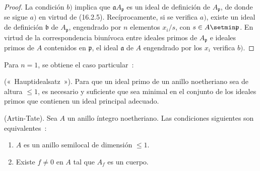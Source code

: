 \begin{proof}
La condición $b)$ implica que $\mathfrak{a}A_{\mathfrak{p}}$ es un ideal de
definición de $A_{\mathfrak{p}}$, de donde se sigue $a)$ en virtud de (16.2.5).
Recíprocamente, si se verifica $a)$, existe un ideal de definición
$\mathfrak{b}$ de $A_{\mathfrak{p}}$, engendrado por $n$ elementos $x_i/s$, con
$s\in A\setmin\mathfrak{p}$. En virtud de la correspondencia biunívoca entre ideales
primos de $A_{\mathfrak{p}}$ e ideales primos de $A$ contenidos en
$\mathfrak{p}$, el ideal $\mathfrak{a}$ de $A$ engendrado por los $x_i$ verifica
$b)$.
\end{proof}


Para $n=1$, se obtiene el caso particular~:

\begin{corollary}[16.3.2]
\label{0.16.3.2-es}
\textup{(«~Hauptidealsatz~»).}
Para que un ideal primo de un anillo noetheriano sea de altura $\leq1$, es
necesario y suficiente que sea minimal en el conjunto de los ideales primos que
contienen un ideal principal adecuado.
\end{corollary}

\begin{corollary}[16.3.3]
\label{0.16.3.3-es}
\textup{(Artin-Tate).}
Sea $A$ un anillo íntegro noetheriano. Las condiciones siguientes son
equivalentes~:
\begin{enumerate}
  \item[\textup{a)}] $A$ es un anillo semilocal de dimensión $\leq1$.
  \item[\textup{b)}] Existe $f\neq0$ en $A$ tal que $A_f$ es un cuerpo.
\end{enumerate}
\end{corollary}

